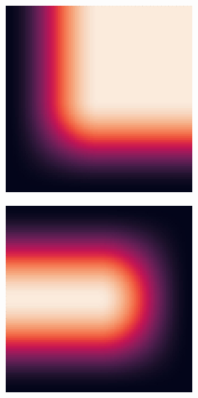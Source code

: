 \begin{figure}
\begin{subfigure}{0.5\textwidth}
\begin{subfigure}{.32\textwidth}
    \end{subfigure}
    \begin{subfigure}{.32\textwidth}
      \centering
      \includegraphics[width=\textwidth]{Images/hann_window_20.jpg}
    \end{subfigure}
    \begin{subfigure}{.32\textwidth}
      \centering
      \includegraphics[width=\textwidth]{Images/hann_window_01.jpg}

\end{subfigure}
\end{subfigure}
\end{figure}
